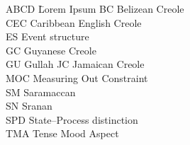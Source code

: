\begin{tabbing}
ABCD\hspace{1cm} \= Lorem Ipsum\kill
BC \> Belizean Creole\\
CEC \> Caribbean English Creole\\
ES \> Event structure\\
GC \> Guyanese Creole\\
GU \> Gullah
JC \> Jamaican Creole\\
MOC \> Measuring Out Constraint\\
SM \> Saramaccan\\
SN \> Sranan\\
SPD \> State--Process distinction\\
TMA \> Tense Mood Aspect\\
\end{tabbing}

  

